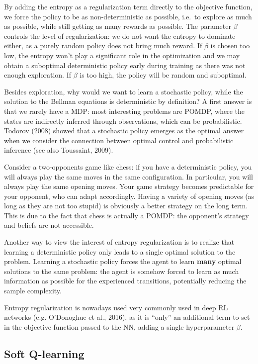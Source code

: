 \documentclass[
  letterpaper,
  DIV=11,
  numbers=noendperiod]{scrreprt}
\begin{document}
By adding the entropy as a regularization term directly to the objective
function, we force the policy to be as non-deterministic as possible,
i.e.~to explore as much as possible, while still getting as many rewards
as possible. The parameter \(\beta\) controls the level of
regularization: we do not want the entropy to dominate either, as a
purely random policy does not bring much reward. If \(\beta\) is chosen
too low, the entropy won't play a significant role in the optimization
and we may obtain a suboptimal deterministic policy early during
training as there was not enough exploration. If \(\beta\) is too high,
the policy will be random and suboptimal.

Besides exploration, why would we want to learn a stochastic policy,
while the solution to the Bellman equations is deterministic by
definition? A first answer is that we rarely have a MDP: most
interesting problems are POMDP, where the states are indirectly inferred
through observations, which can be probabilistic. Todorov (2008) showed
that a stochastic policy emerges as the optimal answer when we consider
the connection between optimal control and probabilistic inference (see
also Toussaint, 2009).

Consider a two-opponents game like chess: if you have a deterministic
policy, you will always play the same moves in the same configuration.
In particular, you will always play the same opening moves. Your game
strategy becomes predictable for your opponent, who can adapt
accordingly. Having a variety of opening moves (as long as they are not
too stupid) is obviously a better strategy on the long term. This is due
to the fact that chess is actually a POMDP: the opponent's strategy and
beliefs are not accessible.

Another way to view the interest of entropy regularization is to realize
that learning a deterministic policy only leads to a single optimal
solution to the problem. Learning a stochastic policy forces the agent
to learn \textbf{many} optimal solutions to the same problem: the agent
is somehow forced to learn as much information as possible for the
experienced transitions, potentially reducing the sample complexity.

Entropy regularization is nowadays used very commonly used in deep RL
networks (e.g. O'Donoghue et al., 2016), as it is ``only'' an additional
term to set in the objective function passed to the NN, adding a single
hyperparameter \(\beta\).

\hypertarget{soft-q-learning}{%
\subsection{Soft Q-learning}\label{soft-q-learning}}
\end{document}
